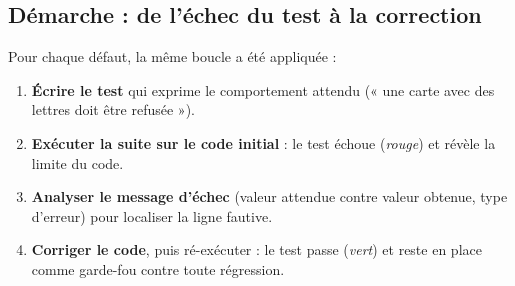 \documentclass[12pt,a4paper]{article}
\begin{document}
\subsection{Démarche : de l'échec du test à la correction}
Pour chaque défaut, la même boucle a été appliquée :
\begin{enumerate}
    \item \textbf{Écrire le test} qui exprime le comportement attendu (« une carte avec des lettres doit être refusée »).
    \item \textbf{Exécuter la suite sur le code initial} : le test échoue (\textit{rouge}) et révèle la limite du code.
    \item \textbf{Analyser le message d'échec} (valeur attendue contre valeur obtenue, type d'erreur) pour localiser la ligne fautive.
    \item \textbf{Corriger le code}, puis ré-exécuter : le test passe (\textit{vert}) et reste en place comme garde-fou contre toute régression.
\end{enumerate}
\end{document}
